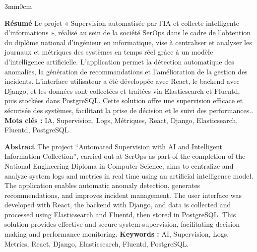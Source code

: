 \begin{changemargin}{3mm}{0cm}
    \begin{minipage}[c]{0.96\columnwidth}
        
        
        
        
        {\LARGE\textbf{Résumé}}
        \vskip1mm
            \begingroup
                \large
                Le projet « Supervision automatisée par l’IA et collecte intelligente d’informations », réalisé au sein de la société SerOps dans le cadre de l’obtention du diplôme national d’ingénieur en informatique, vise à centraliser et analyser les journaux et métriques des systèmes en temps réel grâce à un modèle d’intelligence artificielle. L’application permet la détection automatique des anomalies, la génération de recommandations et l’amélioration de la gestion des incidents. L’interface utilisateur a été développée avec React, le backend avec Django, et les données sont collectées et traitées via Elasticsearch et Fluentd, puis stockées dans PostgreSQL. Cette solution offre une supervision efficace et sécurisée des systèmes, facilitant la prise de décision et le suivi des performances..
            \endgroup
        \vskip1mm
        {\textbf{Mots clés : }
            \begingroup
                IA, Supervision, Logs, Métriques, React, Django, Elasticsearch, Fluentd, PostgreSQL
            \endgroup
        }
        
        {\vskip25mm}
        
        {\LARGE\textbf{Abstract}}
        \vskip1mm
            \begingroup
                \large
                The project “Automated Supervision with AI and Intelligent Information Collection”, carried out at SerOps as part of the completion of the National Engineering Diploma in Computer Science, aims to centralize and analyze system logs and metrics in real time using an artificial intelligence model. The application enables automatic anomaly detection, generates recommendations, and improves incident management. The user interface was developed with React, the backend with Django, and data is collected and processed using Elasticsearch and Fluentd, then stored in PostgreSQL. This solution provides effective and secure system supervision, facilitating decision-making and performance monitoring.
            \endgroup
        \vskip1mm
        {\textbf{Keywords : }
            \begingroup
              AI, Supervision, Logs, Metrics, React, Django, Elasticsearch, Fluentd, PostgreSQL.
            \endgroup
        }
    \end{minipage}
    
\end{changemargin}
